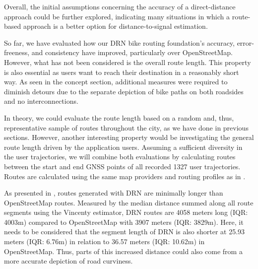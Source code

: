 Overall, the initial assumptions concerning the accuracy of a direct-distance approach could be further explored, indicating many situations in which a route-based approach is a better option for distance-to-signal estimation.

So far, we have evaluated how our DRN bike routing foundation's accuracy, error-freeness, and consistency have improved, particularly over OpenStreetMap. However, what has not been considered is the overall route length. This property is also essential as users want to reach their destination in a reasonably short way. As seen in the concept section, additional measures were required to diminish detours due to the separate depiction of bike paths on both roadsides and no interconnections. 

In theory, we could evaluate the route length based on a random and, thus, representative sample of routes throughout the city, as we have done in previous sections. However, another interesting property would be investigating the general route length driven by the application users. Assuming a sufficient diversity in the user trajectories, we will combine both evaluations by calculating routes between the start and end GNSS points of all recorded 1327 user trajectories. Routes are calculated using the same map providers and routing profiles as in .

As presented in , routes generated with DRN are minimally longer than OpenStreetMap routes. Measured by the median distance summed along all route segments using the Vincenty estimator, DRN routes are 4058 meters long (IQR: 4003m) compared to OpenStreetMap with 3907 meters (IQR: 3829m). Here, it needs to be considered that the segment length of DRN is also shorter at 25.93 meters (IQR: 6.76m) in relation to 36.57 meters (IQR: 10.62m) in OpenStreetMap. Thus, parts of this increased distance could also come from a more accurate depiction of road curviness. 

